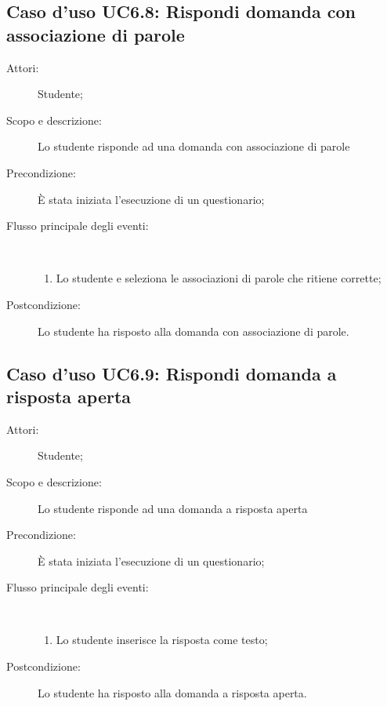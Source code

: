 \subsection{Caso d'uso UC6.8: Rispondi domanda con associazione di parole}\begin{description}
\item[Attori:] Studente;
\item[Scopo e descrizione:] Lo studente risponde ad una domanda con associazione di parole
      \item[Precondizione:] È stata iniziata l'esecuzione di un questionario;

        \item[Flusso principale degli eventi:] \ 
 \begin{enumerate}
          \item Lo studente e seleziona le associazioni di parole che ritiene corrette;

      \end{enumerate}
    \item[Postcondizione:] Lo studente ha risposto alla domanda con associazione di parole.
  \end{description}
\hypertarget{UC6.9}{}
\subsection{Caso d'uso UC6.9: Rispondi domanda a risposta aperta}\begin{description}
\item[Attori:] Studente;
\item[Scopo e descrizione:] Lo studente risponde ad una domanda a risposta aperta
      \item[Precondizione:] È stata iniziata l'esecuzione di un questionario;

        \item[Flusso principale degli eventi:] \ 
 \begin{enumerate}
          \item Lo studente inserisce la risposta come testo;

      \end{enumerate}
    \item[Postcondizione:] Lo studente ha risposto alla domanda a risposta aperta.
  \end{description}
\hypertarget{UC6.10}{}
